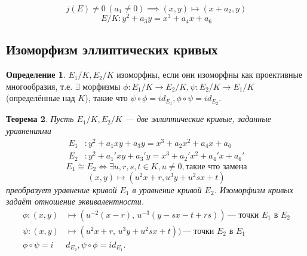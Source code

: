 \documentclass[12pt]{article}
\newtheorem{theorem}{Теорема}
\theoremstyle{definition}
\newtheorem{definition}[theorem]{Определение}
\theoremstyle{definition}
\theoremstyle{definition}
\begin{document}
            \[
            j(E)\neq0 \, (a_1\neq0) \implies (x, y) \mapsto (x+a_2, y)
            \]
            \begin{equation}
                E/K: y^2+a_3y = x^3+a_4x+a_6
            \end{equation}
            
        \subsection{Изоморфизм эллиптических кривых}
            \begin{definition} 
                $E_1/K, E_2/K$ изоморфны, если они изоморфны как проективные многообразия, т.е. $\exists$ морфизмы $\phi: E_1/K \to E_2/K, \psi: E_2/K \to E_1/K$ (определённые над $K$), такие что $\psi \circ \phi = id_{E_1}, \phi \circ \psi = id_{E_2}$.
            \end{definition}
            
            \begin{theorem}
                Пусть $E_1/K, E_2/K$ — две эллиптические кривые, заданные уравнениями 
                \begin{align}
                    E_1&: y^2+a_1xy + a_3y = x^3 + a_2x^2 + a_4x + a_6 \\ \nonumber
                    E_2&: y^2+a_1'xy + a_3'y = x^3 + a_2'x^2 + a_4'x + a_6'
                \end{align}
                \begin{equation*}
                E_1 \cong E_2 \iff \exists u,r,s,t \in K, u\neq0, \text{такие что замена}
                \end{equation*}
                \begin{equation}
                    (x,y) \mapsto (u^2x+r, u^3y+ u^2sx+t)
                \end{equation}
                преобразует уравнение кривой $E_1$ в уравнение кривой $E_2$. Изоморфизм кривых задаёт отношение эквивалентности.
                \begin{align*}
                    \phi : (x,y)&\mapsto (u^{-2}(x-r), \,u^{-3}(y-sx-t+rs))\,\text{— точки $E_1$ в $E_2$} \\
                    \psi : (x,y)&\mapsto (u^2x+r, \,u^3y+u^2sx+t))\, \text{— точки $E_2$ в $E_1$} \\
                    \phi \circ \psi = i&d_{E_2}, \psi \circ \phi = id_{E_1}.
                \end{align*}
            \end{theorem}
            
\end{document}

